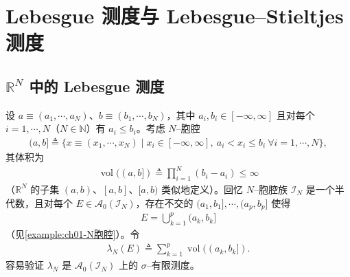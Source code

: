 \documentclass[../../main.tex]{subfiles}%
\begin{document}
\section{Lebesgue 测度与 Lebesgue--Stieltjes 测度}\label{section:ch01-Lebesgue}

\subsection{$\mathbb{R}^N$ 中的 Lebesgue 测度}\label{subsection:ch01-Lebesgue测度}

设 $a\equiv(a_1,\cdots ,a_N)$、$b\equiv(b_1,\cdots ,b_N)$，其中 $a_i,b_i\in[-\infty,\infty]$ 且对每个 $i=1,\cdots ,N$（$N\in\mathbb{N}$）有 $a_i\leqslant b_i$。考虑 $N$--胞腔
\begin{align*}
(a,b]\triangleq\{x\equiv(x_1,\cdots ,x_N)\mid x_i\in[-\infty,\infty],\ a_i<x_i\leqslant b_i\ \forall i=1,\cdots ,N\},
\end{align*}
其体积为
\begin{align*}
\operatorname{vol}((a,b])\triangleq\prod_{i=1}^N(b_i-a_i)\leqslant\infty
\end{align*}
（$\mathbb{R}^N$ 的子集 $(a,b)$、$[a,b]$、$[a,b)$ 类似地定义）。回忆 $N$--胞腔族 $\mathcal{I}_N$ 是一个半代数，且对每个 $E\in\mathcal{A}_0(\mathcal{I}_N)$，存在不交的 $(a_1,b_1],\cdots ,(a_p,b_p]$ 使得
\begin{align*}
E=\bigcup_{k=1}^p(a_k,b_k]
\end{align*}
（见\cref{example:ch01-N胞腔}）。令
\begin{align}
\lambda_N(E)\triangleq \sum_{k=1}^p\operatorname{vol}((a_k,b_k]). \label{align:ch01-lambdaN定义}
\end{align}
容易验证 $\lambda_N$ 是 $\mathcal{A}_0(\mathcal{I}_N)$ 上的 $\sigma$--有限测度。
\end{document}
